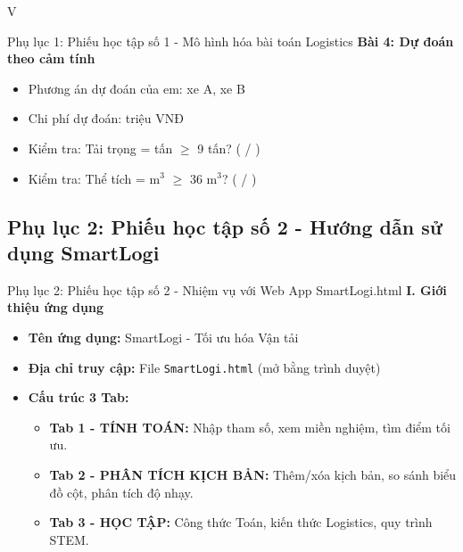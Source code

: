 \begin{competitionsection}{V}
\begin{phieuhoc_tap_box}{Phụ lục 1: Phiếu học tập số 1 - Mô hình hóa bài toán Logistics}
\textbf{Bài 4: Dự đoán theo cảm tính}
\begin{itemize}[leftmargin=*,noitemsep]
\item Phương án dự đoán của em: \underline{\hspace{2cm}} xe A, \underline{\hspace{2cm}} xe B
\item Chi phí dự đoán: \underline{\hspace{3cm}} triệu VNĐ
\item Kiểm tra: Tải trọng = \underline{\hspace{2cm}} tấn $\ge$ 9 tấn? \quad ( / )
\item Kiểm tra: Thể tích = \underline{\hspace{2cm}} m$^3$ $\ge$ 36 m$^3$? \quad ( / )
\end{itemize}
\end{phieuhoc_tap_box}

\newpage
\subsection*{Phụ lục 2: Phiếu học tập số 2 - Hướng dẫn sử dụng SmartLogi}
\begin{phieuhoc_tap_box}{Phụ lục 2: Phiếu học tập số 2 - Nhiệm vụ với Web App SmartLogi.html}
\textbf{\color{accent}I. Giới thiệu ứng dụng}
\begin{itemize}[leftmargin=*,noitemsep]
\item \textbf{Tên ứng dụng:} SmartLogi - Tối ưu hóa Vận tải
\item \textbf{Địa chỉ truy cập:} File \texttt{SmartLogi.html} (mở bằng trình duyệt)
\item \textbf{Cấu trúc 3 Tab:}
    \begin{itemize}
    \item \textbf{Tab 1 - TÍNH TOÁN:} Nhập tham số, xem miền nghiệm, tìm điểm tối ưu.
    \item \textbf{Tab 2 - PHÂN TÍCH KỊCH BẢN:} Thêm/xóa kịch bản, so sánh biểu đồ cột, phân tích độ nhạy.
    \item \textbf{Tab 3 - HỌC TẬP:} Công thức Toán, kiến thức Logistics, quy trình STEM.
    \end{itemize}
\end{itemize}


\end{phieuhoc_tap_box}
\end{competitionsection}
